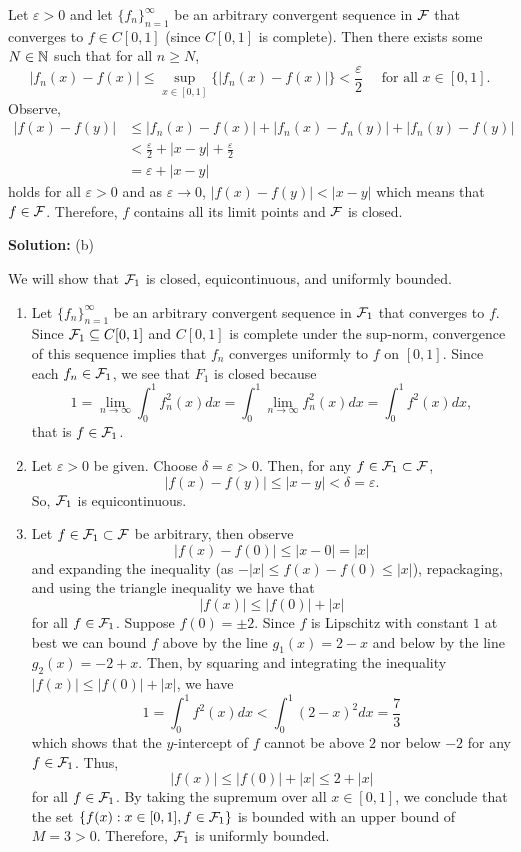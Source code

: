 \documentclass{article}
\begin{document}
Let $\varepsilon > 0$ and let $\{f_n\}_{n=1}^\infty$ be an arbitrary convergent sequence in $\mathcal F$ that converges to $f\in C[0,1]$ (since $C[0,1]$ is complete). Then there exists some $N\in\mathbb N$ such that for all $n\geq N$, 
	\[ |f_n(x) - f(x)| \leq \sup_{x\in [0,1]}\{|f_n(x) - f(x)|\} < \frac{\varepsilon}{2}\quad \text{ for all } x\in [0,1].\]
Observe,
	\begin{align*}
		|f(x) - f(y)| & \leq |f_n(x) - f(x)| + |f_n(x) - f_n(y)| + |f_n(y) - f(y)|\\
				& < \frac{\varepsilon}{2} + |x-y| + \frac{\varepsilon}{2}\\
				& = \varepsilon + |x-y|
	\end{align*}
holds for all $\varepsilon > 0$ and as $\varepsilon \to 0$, $|f(x) - f(y)| < |x-y|$ which means that $f\in \mathcal F$. Therefore, $f$ contains all its limit points and $\mathcal F$ is closed.

\textbf{Solution:} (b) 

We will show that $\mathcal F_1$ is closed, equicontinuous, and uniformly bounded.

\begin{enumerate}
	\item Let $\{f_n\}_{n=1}^\infty$ be an arbitrary convergent sequence in $\mathcal F_1$ that converges to $f$. Since 
		$\mathcal F_1\subseteq C[0,1]$ and $C[0,1]$ is complete under the sup-norm, convergence of this sequence 
		implies that $f_n$ converges uniformly to $f$ on $[0,1]$. Since each $f_n\in \mathcal F_1$, we see that $F_1$ is
		 closed because
			\[ 1 = \lim_{n\to\infty} \int_0^1 f_n^2(x) dx = \int_0^1 \lim_{n\to\infty} f_n^2(x) dx = \int_0^1 f^2(x) dx,\]
		that is $f\in \mathcal F_1$. 
	\item Let $\varepsilon>0$ be given. Choose $\delta = \varepsilon > 0$. Then, for any $f\in \mathcal F_1 \subset \mathcal F$, 
		\[ |f(x) - f(y)| \leq |x-y| < \delta = \varepsilon.\]
		So, $\mathcal F_1$ is equicontinuous.
		
	\item Let $f\in \mathcal F_1\subset \mathcal F$ be arbitrary, then observe
			\[ |f(x) - f(0)| \leq |x-0| = |x|\]
		and expanding the inequality (as $-|x| \leq f(x) - f(0) \leq |x|$), repackaging, and using the triangle inequality
		 we have that 
			\[|f(x)| \leq |f(0)| + |x|\]
		for all $f\in \mathcal F_1$. Suppose $f(0) = \pm 2$. Since $f$ is Lipschitz with constant $1$ at best we can bound $f$
		above by the line $g_1(x) = 2-x$ and below by the line $g_2(x) = -2+x$. Then, by squaring and integrating 
		the inequality $|f(x)| \leq |f(0)| + |x|$, we have
		 	\[ 1 = \int_0^1 f^2(x) dx < \int_0^1(2-x)^2 dx = \frac{7}{3}\]
		which shows that the $y$-intercept of $f$ cannot be above $2$ nor below $-2$ for any $f\in \mathcal F_1$.
		Thus, 
			\[|f(x)| \leq |f(0)| + |x| \leq 2 + |x|\]
		for all $f\in \mathcal F_1$. By taking the supremum over all $x\in [0,1]$, we conclude that the set
		 $\{f(x) : x\in [0,1], f\in\mathcal F_1\}$ is bounded with an upper bound of $M = 3 > 0$. Therefore, $\mathcal F_1$ is uniformly bounded.
\end{enumerate}
	
\end{document}
